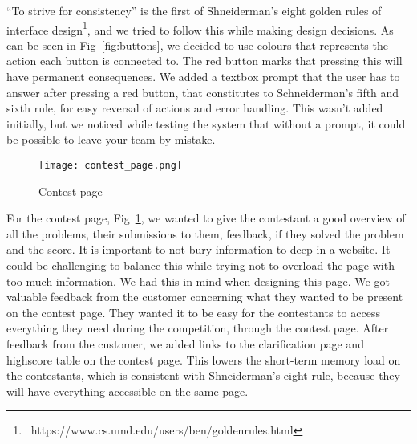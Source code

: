% 
% 
``To strive for consistency'' is the
first of Shneiderman's eight golden rules of interface
design\footnote{\ https://www.cs.umd.edu/users/ben/goldenrules.html},
and we tried to follow this while making design decisions. As can be
seen in Fig~\ref{fig:buttons}, we decided to use colours that represents the action
each button is connected to. The red button marks that pressing this
will have permanent consequences. We added a textbox prompt that the
user has to answer after pressing a red button, that constitutes to
Schneiderman's fifth and sixth rule, for easy reversal
of actions and error handling. This wasn't added
initially, but we noticed while testing the system that without a
prompt, it could be possible to leave your team by mistake.
 
\begin{figure}[h!]
	\texttt{[image: contest\_page.png]} 
	\caption{Contest page}
	\label{fig:contestPage}
\end{figure}

For the contest page, Fig~\ref{fig:contestPage}, we wanted to give the contestant a good
overview of all the problems, their submissions to them, feedback,
if they solved the problem and the score. It is important to not bury
information to deep in a website. It could be challenging to balance
this while trying not to overload the page with too much information.
We had this in mind when designing this page. We got valuable feedback
from the customer concerning what they wanted to be present on the
contest page. They wanted it to be easy for the contestants to access
everything they need during the competition, through the contest page.
After feedback from the customer, we added links to the clarification
page and highscore table on the contest page. This lowers the
short-term memory load on the contestants, which is consistent with
Shneiderman's eight rule, because they will have
everything accessible on the same page.


